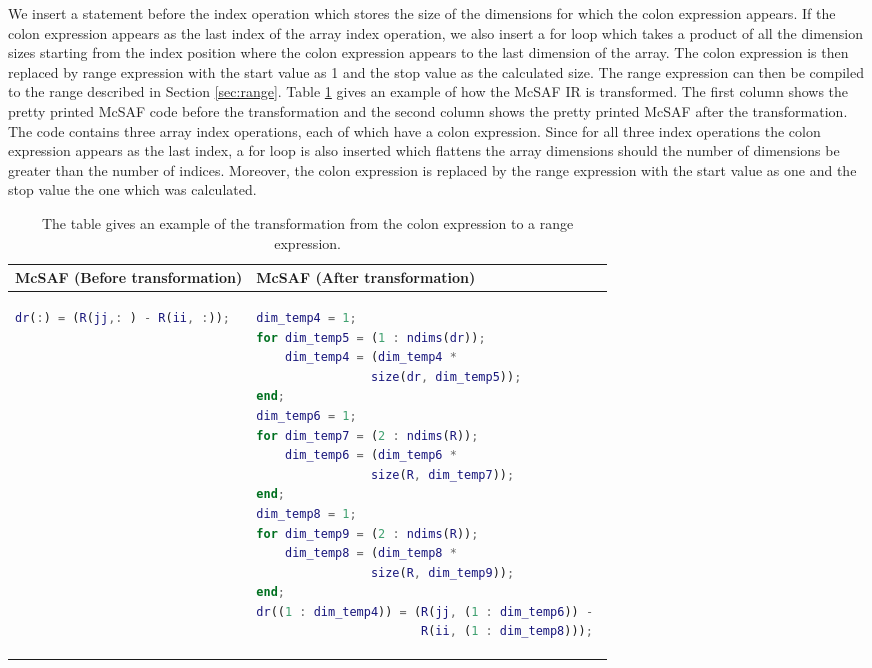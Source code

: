 We insert a statement before the index operation which stores the size of the dimensions for which the colon expression appears. If the colon expression appears as the last index of the array index operation, we also insert a for loop which takes a product of all the dimension sizes starting from the index position where the colon expression appears to the last dimension of the array. The colon expression is then replaced by range expression with the start value as 1 and the stop value as the calculated size. The range expression can then be compiled to the range described in Section \ref{sec:range}. Table \ref{tab:colonExpr} gives an example of how the McSAF IR is transformed. The first column shows the pretty printed McSAF code before the transformation and the second column shows the pretty printed McSAF after the transformation. The code contains three array index operations, each of which have a colon expression. Since for all three index operations the colon expression appears as the last index, a for loop is also inserted which flattens the array dimensions should the number of dimensions be greater than the number of indices. Moreover, the colon expression is replaced by the range expression with the start value as one and the stop value the one which was calculated.
\begin{table}[htbp]
\centering
\begin{tabular}{|l|l|}
\hline

McSAF (Before transformation) & McSAF (After transformation)\\
\hline
{
\begin{lstlisting}[language=matlab,frame=none, numbers=none]
dr(:) = (R(jj,: ) - R(ii, :));
\end{lstlisting}
}
&
{
\begin{lstlisting}[language=matlab,frame=none, numbers=none]
dim_temp4 = 1;
for dim_temp5 = (1 : ndims(dr));
	dim_temp4 = (dim_temp4 * 
				size(dr, dim_temp5));
end;
dim_temp6 = 1;
for dim_temp7 = (2 : ndims(R));
	dim_temp6 = (dim_temp6 * 
				size(R, dim_temp7));
end;
dim_temp8 = 1;
for dim_temp9 = (2 : ndims(R));
	dim_temp8 = (dim_temp8 * 
				size(R, dim_temp9));
end;
dr((1 : dim_temp4)) = (R(jj, (1 : dim_temp6)) - 
					   R(ii, (1 : dim_temp8)));
\end{lstlisting}

}
 \\
\hline
\end{tabular}
\caption[Example of the colon to range expression transformation]{The table gives an example of the transformation from the colon expression to a range expression. }
\label{tab:colonExpr}
\end{table}

